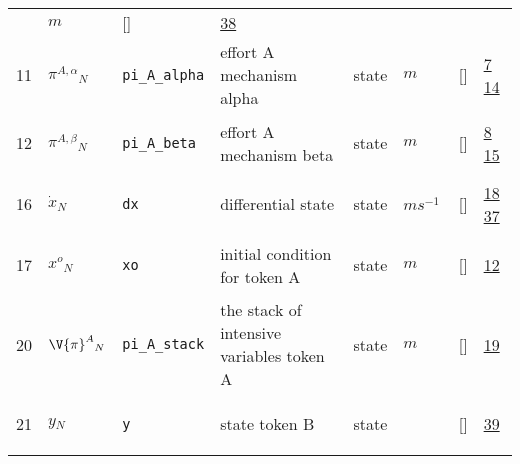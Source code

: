 \begin{longtable}{|p{1cm}|p{3cm}|p{3cm}|p{7cm}|p{3.0cm}|p{3cm}|p{2cm}|p{1cm}|}
             & $ m  $
             & []
             & \hyperlink{"e:38"}{ 38 }
                 \\
    11
             & \hypertarget{"v:11"}{ $ {{\pi^{A,\alpha}}}{_{N}} $}
             & \verb|pi_A_alpha|
             & effort A mechanism alpha
             & \begin{lay}state \end{lay}
             & $ m  $
             & []
             & \hyperlink{"e:7"}{ 7 }
                 \hyperlink{"e:14"}{ 14 }
                 \\
    12
             & \hypertarget{"v:12"}{ $ {{\pi^{A,\beta}}}{_{N}} $}
             & \verb|pi_A_beta|
             & effort A mechanism beta
             & \begin{lay}state \end{lay}
             & $ m  $
             & []
             & \hyperlink{"e:8"}{ 8 }
                 \hyperlink{"e:15"}{ 15 }
                 \\
    16
             & \hypertarget{"v:16"}{ $ {{\dot{x}}}{_{N}} $}
             & \verb|dx|
             & differential state
             & \begin{lay}state \end{lay}
             & $ m s^{-1} \, $
             & []
             & \hyperlink{"e:18"}{ 18 }
                 \hyperlink{"e:37"}{ 37 }
                 \\
    17
             & \hypertarget{"v:17"}{ $ {{x^o}}{_{N}} $}
             & \verb|xo|
             & initial condition for token A
             & \begin{lay}state \end{lay}
             & $ m  $
             & []
             & \hyperlink{"e:12"}{ 12 }
                 \\
    20
             & \hypertarget{"v:20"}{ $ {{\V{\pi}^{A}}}{_{N}} $}
             & \verb|pi_A_stack|
             & the stack of intensive variables token A
             & \begin{lay}state \end{lay}
             & $ m  $
             & []
             & \hyperlink{"e:19"}{ 19 }
                 \\
    21
             & \hypertarget{"v:21"}{ $ {y}{_{N}} $}
             & \verb|y|
             & state token B
             & \begin{lay}state \end{lay}
             & $  $
             & []
             & \hyperlink{"e:39"}{ 39 }

\end{longtable}
